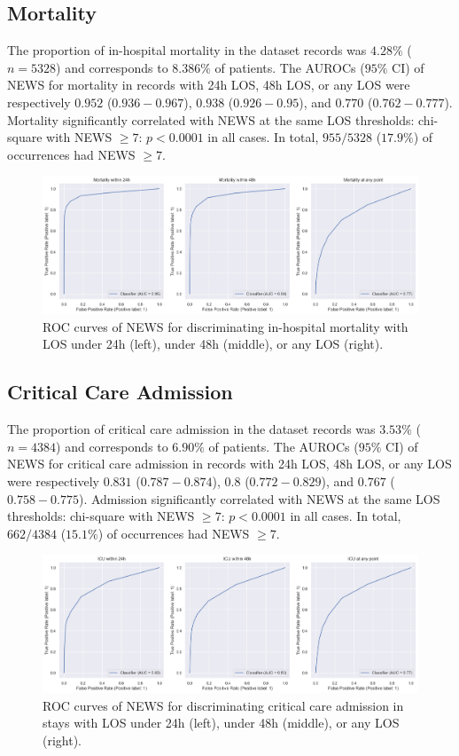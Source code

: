 \documentclass[10pt,journal, compsoc]{IEEEtran}
\begin{document}
\subsection{Mortality}
The proportion of in-hospital mortality in the dataset records was $4.28\%$ ($n=5328$) and corresponds to $8.386\%$ of patients. The AUROCs ($95\%$ CI) of NEWS for mortality in records with 24h LOS, 48h LOS, or any LOS were respectively $0.952$ ($0.936-0.967$), $0.938$ ($0.926-0.95$), and $0.770$ ($0.762-0.777$). Mortality significantly correlated with NEWS at the same LOS thresholds: chi-square with NEWS $\geq 7$: $p < 0.0001$ in all cases. In total, $955/5328$ ($17.9\%$) of occurrences had NEWS $\geq 7$.
\begin{figure}[htbp]
    \centering
    \includegraphics[width=\textwidth]{img/mortality_roc.png}
    \caption{ROC curves of NEWS for discriminating in-hospital mortality with LOS under 24h (left), under 48h (middle), or any LOS (right).}
    \label{fig:mortality_roc}
\end{figure}

\subsection{Critical Care Admission}
The proportion of critical care admission in the dataset records was $3.53\%$ ($n=4384$) and corresponds to $6.90\%$ of patients. The AUROCs ($95\%$ CI) of NEWS for critical care admission in records with 24h LOS, 48h LOS, or any LOS were respectively $0.831$ ($0.787-0.874$), $0.8$ ($0.772-0.829$), and $0.767$ ($0.758-0.775$). Admission significantly correlated with NEWS at the same LOS thresholds: chi-square with NEWS $\geq 7$: $p < 0.0001$ in all cases. In total, $662/4384$ ($15.1\%$) of occurrences had NEWS $\geq 7$.
\begin{figure}[htbp]
    \centering
    \includegraphics[width=\textwidth]{img/criticalcare_roc.png}
    \caption{ROC curves of NEWS for discriminating critical care admission in stays with LOS under 24h (left), under 48h (middle), or any LOS (right).}
    \label{fig:criticalcare_roc}
\end{figure}
\end{document}
